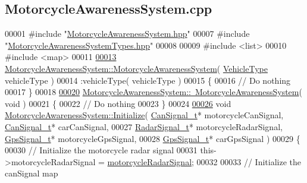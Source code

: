 \hypertarget{MotorcycleAwarenessSystem_8cpp_source}{\subsection{Motorcycle\-Awareness\-System.\-cpp}
}

\begin{DoxyCode}
00001 \textcolor{preprocessor}{#include "\hyperlink{MotorcycleAwarenessSystem_8hpp}{MotorcycleAwarenessSystem.hpp}"}
00007 \textcolor{preprocessor}{#include "\hyperlink{MotorcycleAwarenessSystemTypes_8hpp}{MotorcycleAwarenessSystemTypes.hpp}"}
00008 
00009 \textcolor{preprocessor}{#include <list>}
00010 \textcolor{preprocessor}{#include <map>}
00011 
\hypertarget{MotorcycleAwarenessSystem_8cpp_source_l00013}{}\hyperlink{classMotorcycleAwarenessSystem_ab0fb3823809dc056fecc82cc72a80a55}{00013} \hyperlink{classMotorcycleAwarenessSystem_ab0fb3823809dc056fecc82cc72a80a55}{MotorcycleAwarenessSystem::MotorcycleAwarenessSystem}( 
      \hyperlink{MotorcycleAwarenessSystemTypes_8hpp_a0c05c42b98a847f971385c81c2a81afa}{VehicleType} vehicleType )
00014     :vehicleType( vehicleType )
00015 \{
00016     \textcolor{comment}{// Do nothing}
00017 \}
00018 
\hypertarget{MotorcycleAwarenessSystem_8cpp_source_l00020}{}\hyperlink{classMotorcycleAwarenessSystem_a89ce16a722b3575e1415cbe9c7eedbd3}{00020} \hyperlink{classMotorcycleAwarenessSystem_a89ce16a722b3575e1415cbe9c7eedbd3}{MotorcycleAwarenessSystem::~MotorcycleAwarenessSystem}(
       \textcolor{keywordtype}{void} )
00021 \{
00022     \textcolor{comment}{// Do nothing}
00023 \}
00024 
\hypertarget{MotorcycleAwarenessSystem_8cpp_source_l00026}{}\hyperlink{classMotorcycleAwarenessSystem_a55f1ea16b6311120ea42b460fb8b3a71}{00026} \textcolor{keywordtype}{void} \hyperlink{classMotorcycleAwarenessSystem_a55f1ea16b6311120ea42b460fb8b3a71}{MotorcycleAwarenessSystem::Initialize}( 
      \hyperlink{structCanSignal__t}{CanSignal\_t}* motorcycleCanSignal, \hyperlink{structCanSignal__t}{CanSignal\_t}* carCanSignal,
00027                                             \hyperlink{structRadarSignal__t}{RadarSignal\_t}* motorcycleRadarSignal, 
      \hyperlink{structGpsSignal__t}{GpsSignal\_t}* motorcycleGpsSignal,
00028                                             \hyperlink{structGpsSignal__t}{GpsSignal\_t}* carGpsSignal  )
00029 \{
00030     \textcolor{comment}{// Initialize the motorcycle radar signal}
00031     this->motorcycleRadarSignal = \hyperlink{classMotorcycleAwarenessSystem_a0744e71b9f440a86f5078c876ba7629b}{motorcycleRadarSignal};
00032 
00033     \textcolor{comment}{// Initialize the canSignal map}

\end{DoxyCode}
